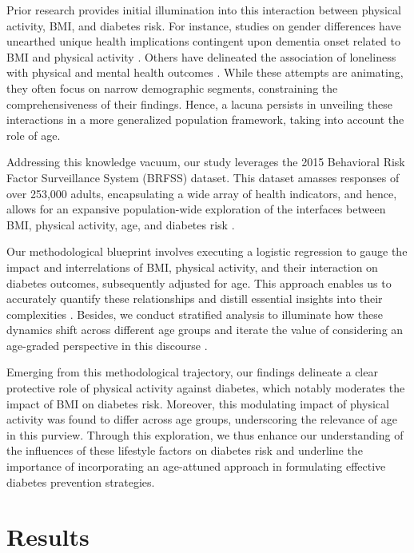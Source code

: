 \documentclass[11pt]{article}
\begin{document}
Prior research provides initial illumination into this interaction between physical activity, BMI, and diabetes risk. For instance, studies on gender differences have unearthed unique health implications contingent upon dementia onset related to BMI and physical activity \cite{Kim2019SexspecificRO}. Others have delineated the association of loneliness with physical and mental health outcomes \cite{Richard2017LonelinessIA}. While these attempts are animating, they often focus on narrow demographic segments, constraining the comprehensiveness of their findings. Hence, a lacuna persists in unveiling these interactions in a more generalized population framework, taking into account the role of age. 

Addressing this knowledge vacuum, our study leverages the 2015 Behavioral Risk Factor Surveillance System (BRFSS) dataset. This dataset amasses responses of over 253,000 adults, encapsulating a wide array of health indicators, and hence, allows for an expansive population-wide exploration of the interfaces between BMI, physical activity, age, and diabetes risk \cite{Preedy1989BehavioralRF, Zahnd2019LungCS}. 

Our methodological blueprint involves executing a logistic regression to gauge the impact and interrelations of BMI, physical activity, and their interaction on diabetes outcomes, subsequently adjusted for age. This approach enables us to accurately quantify these relationships and distill essential insights into their complexities \cite{Menard1996AppliedLR}. Besides, we conduct stratified analysis to illuminate how these dynamics shift across different age groups and iterate the value of considering an age-graded perspective in this discourse \cite{Peduzzi1996ASS}. 

Emerging from this methodological trajectory, our findings delineate a clear protective role of physical activity against diabetes, which notably moderates the impact of BMI on diabetes risk. Moreover, this modulating impact of physical activity was found to differ across age groups, underscoring the relevance of age in this purview. Through this exploration, we thus enhance our understanding of the influences of these lifestyle factors on diabetes risk and underline the importance of incorporating an age-attuned approach in formulating effective diabetes prevention strategies.

\section*{Results}
\end{document}
